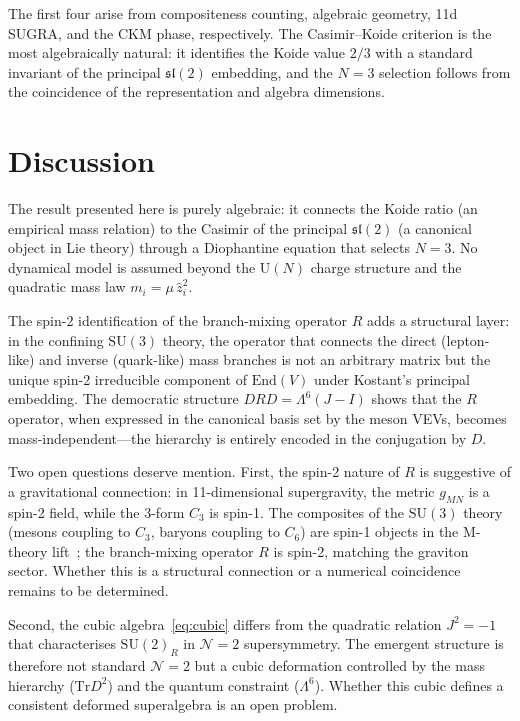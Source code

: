\documentclass[final,3p,times,twocolumn]{elsarticle}
\newcommand{\SU}{\mathrm{SU}}
\newcommand{\UU}{\mathrm{U}}
\newcommand{\Tr}{\mathrm{Tr}}
\begin{document}
The first four arise from compositeness counting, algebraic
geometry, 11d SUGRA, and the CKM phase, respectively.
The Casimir--Koide criterion is the most algebraically natural:
it identifies the Koide value $2/3$ with a standard invariant of
the principal $\mathfrak{sl}(2)$ embedding, and the $N = 3$
selection follows from the coincidence of the representation and
algebra dimensions.


\section{Discussion}
\label{sec:discussion}

The result presented here is purely algebraic: it connects
the Koide ratio (an empirical mass relation) to the Casimir
of the principal $\mathfrak{sl}(2)$ (a canonical object in
Lie theory) through a Diophantine equation that selects $N = 3$.
No dynamical model is assumed beyond the
$\UU(N)$ charge structure and the quadratic mass law
$m_i = \mu\,\hat{z}_i^2$.

The spin-2 identification of the branch-mixing operator $R$
adds a structural layer: in the confining $\SU(3)$ theory, the
operator that connects the direct (lepton-like) and inverse
(quark-like) mass branches is not an arbitrary matrix but the
unique spin-2 irreducible component of $\mathrm{End}(V)$ under
Kostant's principal embedding.
The democratic structure $DRD = \Lambda^6(J - I)$ shows that
the $R$ operator, when expressed in the canonical basis set by
the meson VEVs, becomes mass-independent---the hierarchy is
entirely encoded in the conjugation by $D$.

Two open questions deserve mention.
First, the spin-2 nature of $R$ is suggestive of a gravitational
connection: in 11-dimensional supergravity, the metric $g_{MN}$
is a spin-2 field, while the 3-form $C_3$ is spin-1.
The composites of the $\SU(3)$ theory (mesons coupling to $C_3$,
baryons coupling to $C_6$) are spin-1 objects in the M-theory
lift~\cite{HananyWitten:1997,Rivero:2024}; the branch-mixing
operator $R$ is spin-2, matching the graviton sector.
Whether this is a structural connection or a numerical
coincidence remains to be determined.

Second, the cubic algebra~\eqref{eq:cubic} differs from the
quadratic relation $J^2 = -1$ that characterises $\SU(2)_R$ in
$\mathcal{N} = 2$ supersymmetry.
The emergent structure is therefore not standard $\mathcal{N} = 2$
but a cubic deformation controlled by the mass hierarchy
($\Tr D^2$) and the quantum constraint ($\Lambda^6$).
Whether this cubic defines a consistent deformed superalgebra is
an open problem.
\end{document}
